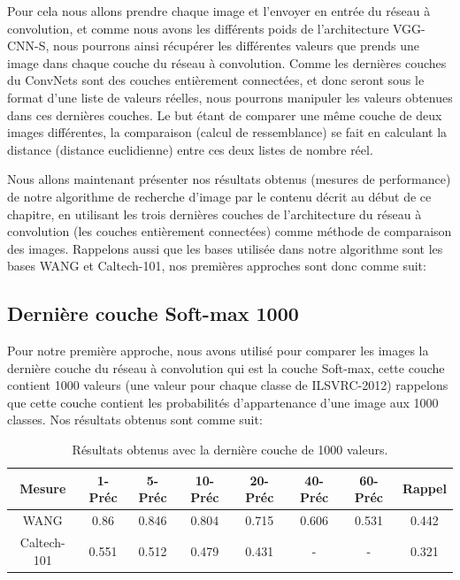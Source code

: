 	Pour cela nous allons prendre chaque image et l'envoyer en entrée du réseau à convolution, et comme nous avons les différents poids de l'architecture VGG-CNN-S, nous pourrons ainsi récupérer les différentes valeurs que prends une image dans chaque couche du réseau à convolution. Comme les dernières couches du ConvNets sont des couches entièrement connectées, et donc seront sous le format d'une liste de valeurs réelles, nous pourrons manipuler les valeurs obtenues dans ces dernières couches. Le but étant de comparer une même couche de deux images différentes, la comparaison (calcul de ressemblance) se fait en calculant la distance (distance euclidienne) entre ces deux listes de nombre réel.
	
	Nous allons maintenant présenter nos résultats obtenus (mesures de performance) de notre algorithme de recherche d'image par le contenu décrit au début de ce chapitre, en utilisant les trois dernières couches de l'architecture du réseau à convolution (les couches entièrement connectées) comme méthode de comparaison des images. Rappelons aussi que les bases utilisée dans notre algorithme sont les bases WANG et Caltech-101, nos premières approches sont donc comme suit:

\subsection{Dernière couche Soft-max 1000}
	Pour notre première approche, nous avons utilisé pour comparer les images la dernière couche du réseau à convolution qui est la couche Soft-max, cette couche contient 1000 valeurs (une valeur pour chaque classe de ILSVRC-2012) rappelons que cette couche contient les probabilités d'appartenance d'une image aux 1000 classes. Nos résultats obtenus sont comme suit:	

\begin{table}[H]
\begin{center}
\begin{tabular}{|c|c|c|c|c|c|c|c|}
\hline
	Mesure & 1-Préc & 5-Préc & 10-Préc & 20-Préc & 40-Préc & 60-Préc & Rappel\\
\hline
	WANG & 0.86 & 0.846 & 0.804 & 0.715 & 0.606 & 0.531 & 0.442\\
\hline
	Caltech-101 & 0.551 & 0.512 & 0.479 & 0.431 & - & - & 0.321\\
\hline
\end{tabular}
\end{center}
\caption{Résultats obtenus avec la dernière couche de 1000 valeurs.}
\end{table}

